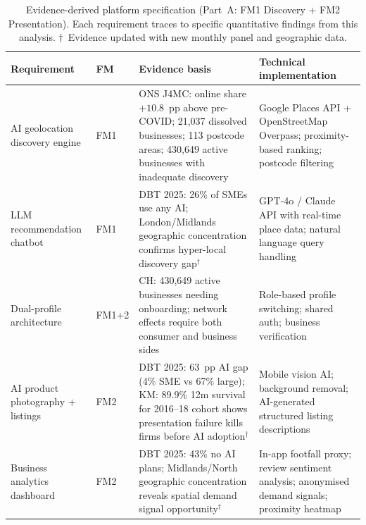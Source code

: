 \documentclass[12pt,a4paper]{article}
\begin{document}
\begin{table}[H]
\centering
\caption{Evidence-derived platform specification (Part~A: FM1 Discovery + FM2 Presentation).
Each requirement traces to specific quantitative findings from this analysis.
$\dagger$~Evidence updated with new monthly panel and geographic data.}
\label{tab:spec_a}
\small{}
\begin{tabular}{@{}L{3.0cm}C{1.4cm}L{5.8cm}L{5.8cm}@{}}
\toprule
{}\color{white}\textbf{Requirement} &
\color{white}\textbf{FM} &
\color{white}\textbf{Evidence basis} &
\color{white}\textbf{Technical implementation} \\
\midrule
AI geolocation discovery engine & FM1 &
ONS J4MC: online share $+10.8$~pp above pre-COVID;
21,037 dissolved businesses; 113 postcode areas;
430,649 active businesses with inadequate discovery &
Google Places API + OpenStreetMap Overpass;
proximity-based ranking; postcode filtering \\
LLM recommendation chatbot & FM1 &
DBT 2025: 26\% of SMEs use any AI; London/Midlands
geographic concentration confirms hyper-local discovery gap$^\dagger$ &
GPT-4o / Claude API with real-time place data;
natural language query handling \\
Dual-profile architecture & FM1+2 &
CH: 430,649 active businesses needing onboarding;
network effects require both consumer and business sides &
Role-based profile switching; shared auth; business verification \\
AI product photography + listings & FM2 &
DBT 2025: 63~pp AI gap (4\% SME vs 67\% large);
KM: 89.9\% 12m survival for 2016--18 cohort shows
presentation failure kills firms before AI adoption$^\dagger$ &
Mobile vision AI; background removal;
AI-generated structured listing descriptions \\
Business analytics dashboard & FM2 &
DBT 2025: 43\% no AI plans; Midlands/North geographic
concentration reveals spatial demand signal opportunity$^\dagger$ &
In-app footfall proxy; review sentiment analysis;
anonymised demand signals; proximity heatmap \\
\bottomrule
\end{tabular}
\end{table}
\end{document}
